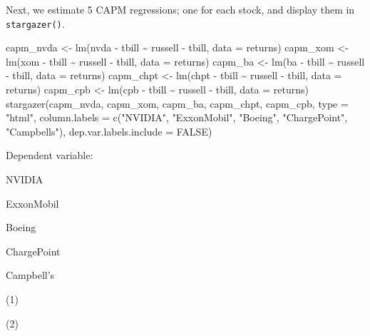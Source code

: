 \documentclass[
  letterpaper,
]{book}
\newenvironment{Shaded}{\begin{snugshade}}{\end{snugshade}}
\newcommand{\AttributeTok}[1]{\textcolor[rgb]{0.40,0.45,0.13}{#1}}
\newcommand{\ConstantTok}[1]{\textcolor[rgb]{0.56,0.35,0.01}{#1}}
\newcommand{\FunctionTok}[1]{\textcolor[rgb]{0.28,0.35,0.67}{#1}}
\newcommand{\NormalTok}[1]{\textcolor[rgb]{0.00,0.23,0.31}{#1}}
\newcommand{\OtherTok}[1]{\textcolor[rgb]{0.00,0.23,0.31}{#1}}
\newcommand{\SpecialCharTok}[1]{\textcolor[rgb]{0.37,0.37,0.37}{#1}}
\newcommand{\StringTok}[1]{\textcolor[rgb]{0.13,0.47,0.30}{#1}}
\begin{document}
Next, we estimate 5 CAPM regressions; one for each stock, and display
them in \texttt{stargazer()}.

\begin{Shaded}
\begin{Highlighting}[]
\NormalTok{capm\_nvda }\OtherTok{\textless{}{-}} \FunctionTok{lm}\NormalTok{(nvda }\SpecialCharTok{{-}}\NormalTok{ tbill }\SpecialCharTok{\textasciitilde{}}\NormalTok{ russell }\SpecialCharTok{{-}}\NormalTok{ tbill, }\AttributeTok{data =}\NormalTok{ returns)}
\NormalTok{capm\_xom }\OtherTok{\textless{}{-}} \FunctionTok{lm}\NormalTok{(xom }\SpecialCharTok{{-}}\NormalTok{ tbill }\SpecialCharTok{\textasciitilde{}}\NormalTok{ russell }\SpecialCharTok{{-}}\NormalTok{ tbill, }\AttributeTok{data =}\NormalTok{ returns)}
\NormalTok{capm\_ba }\OtherTok{\textless{}{-}} \FunctionTok{lm}\NormalTok{(ba }\SpecialCharTok{{-}}\NormalTok{ tbill }\SpecialCharTok{\textasciitilde{}}\NormalTok{ russell }\SpecialCharTok{{-}}\NormalTok{ tbill, }\AttributeTok{data =}\NormalTok{ returns)}
\NormalTok{capm\_chpt }\OtherTok{\textless{}{-}} \FunctionTok{lm}\NormalTok{(chpt }\SpecialCharTok{{-}}\NormalTok{ tbill }\SpecialCharTok{\textasciitilde{}}\NormalTok{ russell }\SpecialCharTok{{-}}\NormalTok{ tbill, }\AttributeTok{data =}\NormalTok{ returns)}
\NormalTok{capm\_cpb }\OtherTok{\textless{}{-}} \FunctionTok{lm}\NormalTok{(cpb }\SpecialCharTok{{-}}\NormalTok{ tbill }\SpecialCharTok{\textasciitilde{}}\NormalTok{ russell }\SpecialCharTok{{-}}\NormalTok{ tbill, }\AttributeTok{data =}\NormalTok{ returns)}
\FunctionTok{stargazer}\NormalTok{(capm\_nvda, capm\_xom, capm\_ba, capm\_chpt, capm\_cpb, }
          \AttributeTok{type =} \StringTok{"html"}\NormalTok{,}
          \AttributeTok{column.labels =} \FunctionTok{c}\NormalTok{(}\StringTok{"NVIDIA"}\NormalTok{, }\StringTok{"ExxonMobil"}\NormalTok{, }\StringTok{"Boeing"}\NormalTok{, }\StringTok{"ChargePoint"}\NormalTok{, }\StringTok{"Campbell\textquotesingle{}s"}\NormalTok{),}
          \AttributeTok{dep.var.labels.include =} \ConstantTok{FALSE}\NormalTok{)}
\end{Highlighting}
\end{Shaded}

Dependent variable:

NVIDIA

ExxonMobil

Boeing

ChargePoint

Campbell's

(1)

(2)
\end{document}
